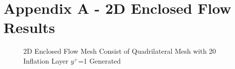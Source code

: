 \newpage
\flushleft
\section*{{Appendix A - 2D Enclosed Flow Results}} 
\label{sec: appendix_a}


\begin{figure}[!ht]
    \noindent{}
    \caption{2D Enclosed Flow Mesh Consist of Quadrilateral Mesh with 20 Inflation Layer $y^+$=1 Generated} 
    \label{fig:2D_EN_MESH}
\end{figure}

